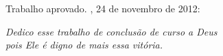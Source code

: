 \documentclass[12pt, oneside, a4paper, brazil]{abntex2}
\begin{document}
%
% 
%
\begin{folhadeaprovacao}

  \begin{center}
    {\ABNTEXchapterfont\large\imprimirautor}

    \vspace*{\fill}\vspace*{\fill}
    \begin{center}
      \ABNTEXchapterfont\bfseries\Large\imprimirtitulo
    \end{center}
    \vspace*{\fill}
    
    \hspace{.45\textwidth}
    \begin{minipage}{.5\textwidth}
        \imprimirpreambulo
    \end{minipage}%
    \vspace*{\fill}
   \end{center}
        
   Trabalho aprovado. \imprimirlocal, 24 de novembro de 2012:

      
   \begin{center}
    \vspace*{0.5cm}
    {\large\imprimirlocal}
    \par
    {\large\imprimirdata}
    \vspace*{1cm}
  \end{center}
  
\end{folhadeaprovacao}

\begin{dedicatoria}
   \vspace*{\fill}
   \centering
   \noindent
   \textit{ Dedico esse trabalho de conclusão de curso a Deus \\
   pois Ele é digno de mais essa vitória.} \vspace*{\fill}
\end{dedicatoria}
\end{document}
